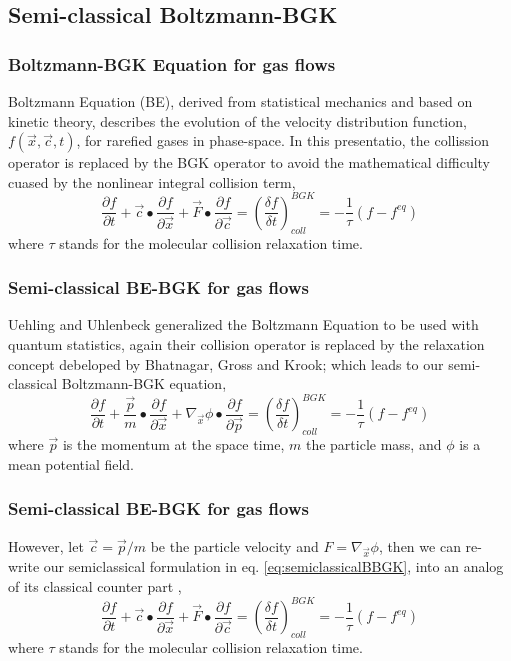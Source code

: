 \subsection{Semi-classical Boltzmann-BGK}

\begin{frame} \frametitle{Boltzmann-BGK Equation for gas flows}
	Boltzmann Equation (BE), derived from statistical mechanics and based on kinetic theory, describes the evolution of the velocity distribution function, $f(\vec{x},\vec{c},t)$, for rarefied gases in phase-space. In this presentatio, the collission operator is replaced by the BGK operator to avoid the mathematical difficulty cuased by the nonlinear integral collision term,
	\begin{equation}
	\frac{\partial{f}}{\partial{t}} +
	\vec{c}\bullet\frac{\partial{f}}{\partial{\vec{x}}} +
	\vec{F}\bullet\frac{\partial{f}}{\partial{\vec{c}}} = 
	\left( \frac{\delta f}{\delta t}\right )^{BGK}_{coll} = -\frac{1}{\tau}(f-f^{eq})
	\label{eq:classicalBBGK}
	\end{equation}
	where $\tau$ stands for the molecular collision relaxation time.
\end{frame}

\begin{frame} \frametitle{Semi-classical BE-BGK for gas flows}
	Uehling and Uhlenbeck \cite{PhysRev.43.552} generalized the Boltzmann Equation to be used with quantum statistics, again their collision operator is replaced by the relaxation concept debeloped by Bhatnagar, Gross and Krook; which leads to our semi-classical Boltzmann-BGK equation,
	\begin{equation}
	\frac{\partial{f}}{\partial{t}} +
	\frac{\vec{p}}{m}\bullet\frac{\partial{f}}{\partial{\vec{x}}} +
	\nabla_\vec{x}{\phi}\bullet\frac{\partial{f}}{\partial{\vec{p}}} = 
	\left( \frac{\delta f}{\delta t}\right )^{BGK}_{coll} = -\frac{1}{\tau}(f-f^{eq})
	\label{eq:semiclassicalBBGK}
	\end{equation}
	where $\vec{p}$ is the momentum at the space time, $m$ the particle mass, and $\phi$ is a mean potential field.
\end{frame}

\begin{frame} \frametitle{Semi-classical BE-BGK for gas flows}
	However, let $\vec{c} = \vec{p} / m$ be the particle velocity and $F = \nabla_\vec{x}{\phi}$, then we can re-write our semiclassical formulation in eq. \ref{eq:semiclassicalBBGK}, into an analog of its classical counter part \cite{Yang2013},
	\begin{equation}
	\frac{\partial{f}}{\partial{t}} +
	\vec{c}\bullet\frac{\partial{f}}{\partial{\vec{x}}} +
	\vec{F}\bullet\frac{\partial{f}}{\partial{\vec{c}}} = 
	\left( \frac{\delta f}{\delta t}\right )^{BGK}_{coll} = -\frac{1}{\tau}(f-f^{eq})
	\end{equation}
	where $\tau$ stands for the molecular collision relaxation time.
\end{frame}

